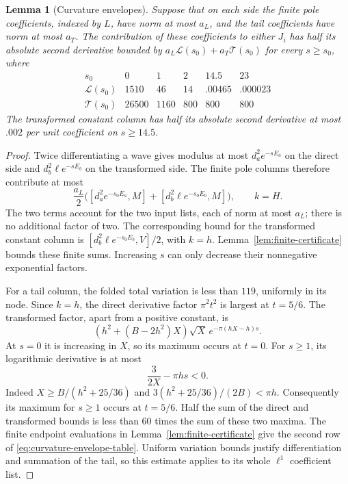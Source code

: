 \documentclass[11pt]{article}
\newtheorem{lemma}[theorem]{Lemma}
\theoremstyle{remark}\newtheorem{remark}[theorem]{Remark}
\begin{document}
\begin{lemma}[Curvature envelopes]\label{lem:curvature-envelopes}
Suppose that on each side the finite pole coefficients, indexed by
$L$, have norm at most $a_L$, and the tail coefficients have norm at
most $a_T$.  The contribution of these coefficients to either $J_i$
has half its absolute second derivative bounded by
$a_L\mathcal L(s_0)+a_T\mathcal T(s_0)$ for every $s\ge s_0$, where
\begin{equation}\label{eq:curvature-envelope-table}
\begin{array}{c|rrrrr}
s_0&0&1&2&14.5&23\\\hline
\mathcal L(s_0)&1510&46&14&.00465&.000023\\
\mathcal T(s_0)&26500&1160&800&800&800
\end{array}
\end{equation}
The transformed constant column has half its absolute second derivative
at most $.002$ per unit coefficient on $s\ge14.5$.
\end{lemma}

\begin{proof}
Twice differentiating a wave gives modulus at most
$d_a^2e^{-sE_a}$ on the direct side and
$d_b^2\ell e^{-sE_b}$ on the transformed side.  The finite pole
columns therefore contribute at most
\[
 \frac {a_L}2\bigl([d_a^2e^{-s_0E_a},M]
             +[d_b^2\ell e^{-s_0E_b},M]\bigr),\qquad k=H.
\]
The two terms account for the two input lists, each of norm at most
$a_L$; there is no additional factor of two.  The corresponding bound
for the transformed constant column is
$[d_b^2\ell e^{-s_0E_b},V]/2$, with $k=h$.
Lemma~\ref{lem:finite-certificate} bounds these finite sums.  Increasing
$s$ can only decrease their nonnegative exponential factors.

For a tail column, the folded total variation is less than $119$,
uniformly in its node.  Since $k=h$, the direct derivative factor
$\pi^2t^2$ is largest at $t=5/6$.  The transformed factor, apart
from a positive constant, is
\[
 (h^2+(B-2h^2)X)\sqrt X\,e^{-\pi(hX-h)s}.
\]
At $s=0$ it is increasing in $X$, so its maximum occurs at $t=0$.
For $s\ge1$, its logarithmic derivative is at most
\[
 \frac{3}{2X}-\pi hs<0.
\]
Indeed $X\ge B/(h^2+25/36)$ and
$3(h^2+25/36)/(2B)<\pi h$.  Consequently its maximum for
$s\ge1$ occurs at $t=5/6$.  Half the sum of the direct and
transformed bounds is less than $60$ times the sum of these two
maxima.  The finite endpoint evaluations in
Lemma~\ref{lem:finite-certificate} give the second row of
\eqref{eq:curvature-envelope-table}.  Uniform variation bounds justify
differentiation and summation of the tail, so this estimate applies
to its whole $\ell^1$ coefficient list.
\end{proof}
\end{document}
